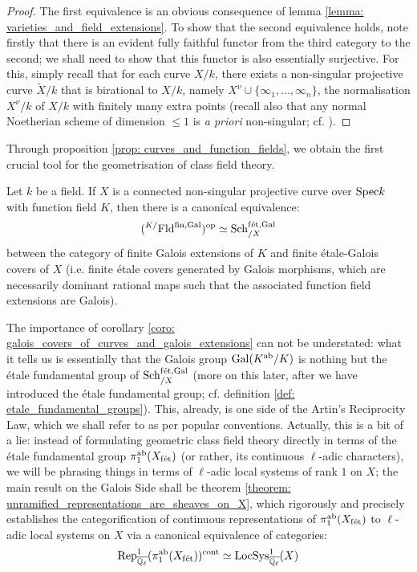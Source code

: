             \begin{proof}
                The first equivalence is an obvious consequence of lemma \ref{lemma: varieties_and_field_extensions}. To show that the second equivalence holds, note firstly that there is an evident fully faithful functor from the third category to the second; we shall need to show that this functor is also essentially surjective. For this, simply recall that for each curve $X/k$, there exists a non-singular projective curve $\tilde{X}/k$ that is birational to $X/k$, namely $X^{\nu} \cup \{\infty_1, ..., \infty_n\}$, the normalisation $X^{\nu}/k$ of $X/k$ with finitely many extra points (recall also that any normal Noetherian scheme of dimension $\leq 1$ is \textit{a priori} non-singular; cf. \cite[\href{https://stacks.math.columbia.edu/tag/0BX2}{Tag 0BX2}]{stacks}).
            \end{proof}
            
        Through proposition \ref{prop: curves_and_function_fields}, we obtain the first crucial tool for the geometrisation of class field theory.
        \begin{corollary} \label{coro: galois_covers_of_curves_and_galois_extensions}
            Let $k$ be a field. If $X$ is a connected non-singular projective curve over $\mathrm{Spec} k$ with function field $K$, then there is a canonical equivalence:
                $$({}^{K/}\mathrm{Fld}^{\mathrm{fin}, \mathrm{Gal}})^{\mathrm{op}} \simeq \mathrm{Sch}_{/X}^{\mathrm{f\acute{e}t}, \mathrm{Gal}}$$
            between the category of finite Galois extensions of $K$ and finite \'etale-Galois covers of $X$ (i.e. finite \'etale covers generated by Galois morphisms, which are necessarily dominant rational maps such that the associated function field extensions are Galois). 
        \end{corollary}
        The importance of corollary \ref{coro: galois_covers_of_curves_and_galois_extensions} can not be understated: what it tells us is essentially that the Galois group $\mathrm{Gal}(K^{\mathrm{ab}}/K)$ is nothing but the \'etale fundamental group of $\mathrm{Sch}_{/X}^{\mathrm{f\acute{e}t}, \mathrm{Gal}}$ (more on this later, after we have introduced the \'etale fundamental group; cf. definition \ref{def: etale_fundamental_groups}). This, already, is one side of the Artin's Reciprocity Law, which we shall refer to as  per popular conventions. Actually, this is a bit of a lie: instead of formulating geometric class field theory directly in terms of the \'etale fundamental group $\pi_1^{\mathrm{ab}}(X_{\mathrm{f\acute{e}t}})$ (or rather, its continuous $\ell$-adic characters), we will be phrasing things in terms of $\ell$-adic local systems of rank $1$ on $X$; the main result on the Galois Side shall be theorem \ref{theorem: unramified_representations_are_sheaves_on_X}, which rigorously and precisely establishes the categorification of continuous representations of $\pi_1^{\mathrm{ab}}(X_{\mathrm{f\acute{e}t}})$ to $\ell$-adic local systems on $X$ via a canonical equivalence of categories:
            $$\mathrm{Rep}^1_{\overline{\mathbb{Q}_{\ell}}}(\pi_1^{\mathrm{ab}}(X_{\mathrm{f\acute{e}t}}))^{\mathrm{cont}} \simeq \mathrm{LocSys}^1_{\overline{\mathbb{Q}_{\ell}}}(X)$$
        
